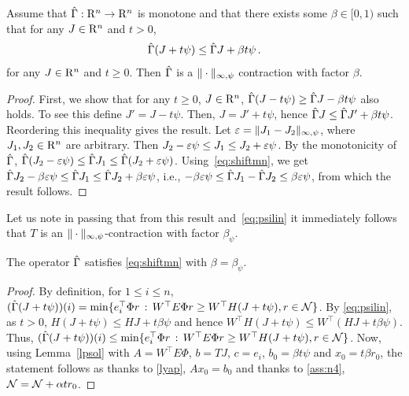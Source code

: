 \begin{lemma}\label{maxnormmn}
Assume that $\hat{\Gamma}: \mathrm{R}^n \to \mathrm{R}^n$ is monotone and 
that there exists some $\beta\in [0,1)$ such that for any $J\in \mathrm{R}^n$ and $t>0$,
\begin{align}
\label{eq:shiftmn}
\hg( J + t \psi) \le \hg J + \beta t \psi\,.
\end{align} 
for any $J\in \mathrm{R}^n$ and $t\ge 0$.
Then $\hat{\Gamma}$ is a $\|\cdot\|_{\infty,\psi}$ contraction with factor $\beta$.
\end{lemma}
\begin{proof}
First, we show that for any $t\ge 0$,  $J\in \mathrm{R}^n$,
$\hat{\Gamma}( J - t \psi) \ge \hat{\Gamma} J - \beta t \psi$ also holds.
To see this define $J' = J-t\psi$. Then, $J = J'+t\psi$, hence $\hat{\Gamma} J \le \hat{\Gamma} J' + \beta t \psi$. Reordering this inequality gives the result.
Let $\varepsilon = \|J_1 - J_2\|_{\infty,\psi}$, where $J_1,J_2\in \mathrm{R}^n$ are arbitrary.
Then $J_2 - \varepsilon \psi \le J_1 \le J_2 + \varepsilon \psi$. 
By the monotonicity of $\hat{\Gamma}$,
$\hat{\Gamma}(J_2 - \varepsilon \psi) \le \hat{\Gamma} J_1 \le \hat{\Gamma}(J_2 + \varepsilon \psi)$. 
Using~\eqref{eq:shiftmn}, we get 
$\hat{\Gamma} J_2 - \beta \varepsilon \psi \le \hat{\Gamma} J_1 \le \hat{\Gamma} J_2 + \beta \varepsilon \psi$, i.e., $-\beta \varepsilon \psi \le \hat{\Gamma} J_1 - \hat{\Gamma} J_2 \le \beta \varepsilon \psi$, from which the result follows.
\end{proof}
\begin{corollary}\label{tmaxnormmn}
Let us note in passing that from this result and~\eqref{eq:psilin} it immediately follows that $T$ is an $\|\cdot\|_{\infty,\psi}$-contraction with factor $\beta_{\psi}$.
\end{corollary}
\begin{lemma}\label{gshiftmn}
The operator $\hat{\Gamma}$ satisfies \eqref{eq:shiftmn} with $\beta = \beta_\psi$.
\end{lemma}
\begin{proof}
By definition, for $1\le i \le n$, $(\hat{\Gamma} (J+t\psi) )(i) = \min\{ e_i^\top \Phi r \,:\, W^\top E\Phi r \ge W^\top H(J+t\psi), r\in \mathcal{N} \}$.
By \cref{eq:psilin}, as $t>0$, $H(J+t\psi) \le HJ + t \beta \psi$ and hence $W^\top H(J+t\psi) \le W^\top (HJ + t \beta \psi)$. Thus,
$(\hat{\Gamma} (J+t\psi) )(i) \le 
 \min\{ e_i^\top \Phi r \,:\, W^\top E\Phi r \ge W^\top H(J+t\psi), r\in \mathcal{N} \}$.
Now, using Lemma~\ref{lpsol} with $A=W^\top E \Phi$, $b=TJ$, $c=e_i$, $b_0=\beta t \psi$ 
and $x_0=t \beta r_0$, the statement follows
as thanks to \cref{lyap}, $A x_0 = b_0$ and thanks to
\cref{ass:n4}, $\mathcal{N} = \mathcal{N} + \alpha t r_0$.
\end{proof}
